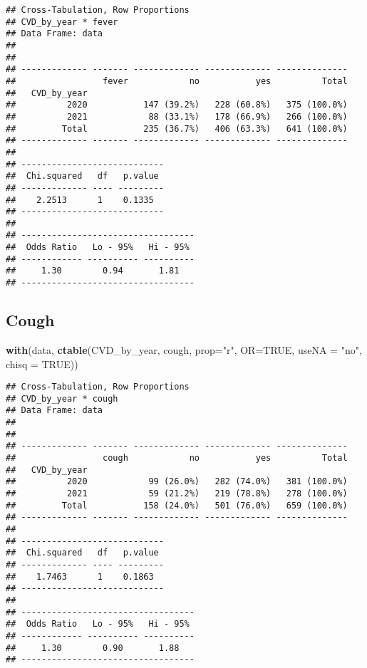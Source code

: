 \documentclass[
]{article}
\newenvironment{Shaded}{\begin{snugshade}}{\end{snugshade}}
\newcommand{\AttributeTok}[1]{\textcolor[rgb]{0.13,0.29,0.53}{#1}}
\newcommand{\ConstantTok}[1]{\textcolor[rgb]{0.56,0.35,0.01}{#1}}
\newcommand{\FunctionTok}[1]{\textcolor[rgb]{0.13,0.29,0.53}{\textbf{#1}}}
\newcommand{\NormalTok}[1]{#1}
\newcommand{\StringTok}[1]{\textcolor[rgb]{0.31,0.60,0.02}{#1}}
\begin{document}
\begin{verbatim}
## Cross-Tabulation, Row Proportions  
## CVD_by_year * fever  
## Data Frame: data  
## 
## 
## ------------- ------- ------------- ------------- --------------
##                 fever            no           yes          Total
##   CVD_by_year                                                   
##          2020           147 (39.2%)   228 (60.8%)   375 (100.0%)
##          2021            88 (33.1%)   178 (66.9%)   266 (100.0%)
##         Total           235 (36.7%)   406 (63.3%)   641 (100.0%)
## ------------- ------- ------------- ------------- --------------
## 
## ----------------------------
##  Chi.squared   df   p.value 
## ------------- ---- ---------
##    2.2513      1    0.1335  
## ----------------------------
## 
## ----------------------------------
##  Odds Ratio   Lo - 95%   Hi - 95% 
## ------------ ---------- ----------
##     1.30        0.94       1.81   
## ----------------------------------
\end{verbatim}

\hypertarget{cough}{%
\subsection{Cough}\label{cough}}

\begin{Shaded}
\begin{Highlighting}[]
\FunctionTok{with}\NormalTok{(data, }\FunctionTok{ctable}\NormalTok{(CVD\_by\_year, cough, }\AttributeTok{prop=}\StringTok{"r"}\NormalTok{, }\AttributeTok{OR=}\ConstantTok{TRUE}\NormalTok{, }\AttributeTok{useNA =} \StringTok{"no"}\NormalTok{, }\AttributeTok{chisq =} \ConstantTok{TRUE}\NormalTok{))}
\end{Highlighting}
\end{Shaded}

\begin{verbatim}
## Cross-Tabulation, Row Proportions  
## CVD_by_year * cough  
## Data Frame: data  
## 
## 
## ------------- ------- ------------- ------------- --------------
##                 cough            no           yes          Total
##   CVD_by_year                                                   
##          2020            99 (26.0%)   282 (74.0%)   381 (100.0%)
##          2021            59 (21.2%)   219 (78.8%)   278 (100.0%)
##         Total           158 (24.0%)   501 (76.0%)   659 (100.0%)
## ------------- ------- ------------- ------------- --------------
## 
## ----------------------------
##  Chi.squared   df   p.value 
## ------------- ---- ---------
##    1.7463      1    0.1863  
## ----------------------------
## 
## ----------------------------------
##  Odds Ratio   Lo - 95%   Hi - 95% 
## ------------ ---------- ----------
##     1.30        0.90       1.88   
## ----------------------------------
\end{verbatim}
\end{document}
